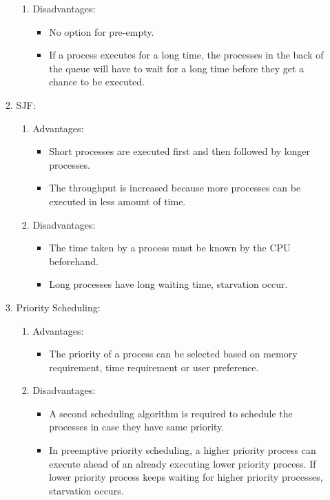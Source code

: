 \documentclass[a4paper]{article}
\begin{document}
\begin{enumerate}[label = \alph*]
\begin{enumerate}
\begin{enumerate}
            \item Disadvantages:
            \begin{itemize}
                \item No option for pre-empty.
                \item If a process executes for a long time, the processes in the back of the queue will have to wait for a long time before they get a chance to be executed.
            \end{itemize}
        \end{enumerate}

        \item SJF:
        \begin{enumerate}
            \item Advantages:
            \begin{itemize}
                \item Short processes are executed first and then followed by longer processes.
                \item The throughput is increased because more processes can be executed in less amount of time.
            \end{itemize}

            \item Disadvantages:
            \begin{itemize}
                \item The time taken by a process must be known by the CPU beforehand.
                \item Long processes have long waiting time, starvation occur. 
            \end{itemize}
        \end{enumerate}

        \item Priority Scheduling:
        \begin{enumerate}
            \item Advantages:
            \begin{itemize}
                \item The priority of a process can be selected based on memory requirement, time requirement or user preference.
            \end{itemize}

            \item Disadvantages:
            \begin{itemize}
                \item A second scheduling algorithm is required to schedule the processes in case they have same priority.
                \item In preemptive priority scheduling, a higher priority process can execute ahead of an already executing lower priority process. If lower priority process keeps waiting for higher priority processes, starvation occurs.
            \end{itemize}
        \end{enumerate}


\end{enumerate}
\end{enumerate}
\end{document}
